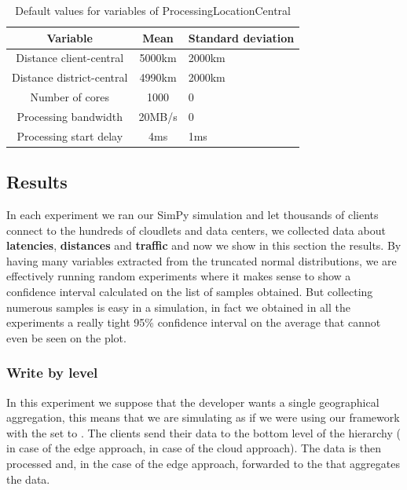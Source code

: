 \begin{table}[H]
\centering
\begin{tabular}{|c|c|l|}
\rowcolor{bluepoli!40} %
\hline
\textbf{Variable}           & \textbf{Mean}   & \textbf{Standard deviation}   \\ \hline \hline
Distance client-central     & 5000km          & 2000km                        \\ \hline
Distance district-central   & 4990km          & 2000km                        \\ \hline
Number of cores             & 1000            & 0                             \\ \hline
Processing bandwidth        & 20MB/s          & 0                             \\ \hline
Processing start delay      & 4ms             & 1ms                           \\ \hline
\end{tabular}
\caption{Default values for variables of ProcessingLocationCentral}
\label{tab:default_setting_central}
\end{table}


\subsection{Results}
In each experiment we ran our SimPy simulation and let thousands of clients connect to the hundreds of cloudlets and data centers, we collected data about \textbf{latencies}, \textbf{distances} and \textbf{traffic} and now we show in this section the results.
By having many variables extracted from the truncated normal distributions, we are effectively running random experiments where it makes sense to show a confidence interval calculated on the list of samples obtained. But collecting numerous samples is easy in a simulation, in fact we obtained in all the experiments a really tight 95\% confidence interval on the average that cannot even be seen on the plot.


\subsubsection{Write by level}
In this experiment we suppose that the developer wants a single geographical aggregation, this means that we are simulating as if we were using our framework with the  set to .
The clients send their data to the bottom level of the hierarchy ( in case of the edge approach,  in case of the cloud approach). The data is then processed and, in the case of the edge approach, forwarded to the  that aggregates the data.

